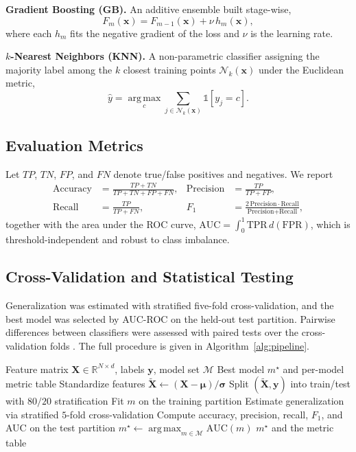 \documentclass[conference]{IEEEtran}
\begin{document}
\textbf{Gradient Boosting (GB).} An additive ensemble built stage-wise,
\begin{equation}
F_m(\mathbf{x})=F_{m-1}(\mathbf{x})+\nu\,h_m(\mathbf{x}),
\end{equation}
where each $h_m$ fits the negative gradient of the loss and $\nu$ is the learning rate.

\textbf{$k$-Nearest Neighbors (KNN).} A non-parametric classifier assigning the majority label
among the $k$ closest training points $\mathcal{N}_k(\mathbf{x})$ under the Euclidean metric,
\begin{equation}
\hat{y}=\operatorname*{arg\,max}_{c}\sum_{j\in\mathcal{N}_k(\mathbf{x})}\mathbb{1}\!\left[y_j=c\right].
\end{equation}

\subsection{Evaluation Metrics}
Let $TP$, $TN$, $FP$, and $FN$ denote true/false positives and negatives. We report
\begin{align}
\text{Accuracy}&=\frac{TP+TN}{TP+TN+FP+FN}, &
\text{Precision}&=\frac{TP}{TP+FP},\\
\text{Recall}&=\frac{TP}{TP+FN}, &
F_1&=\frac{2\,\text{Precision}\cdot\text{Recall}}{\text{Precision}+\text{Recall}},
\end{align}
together with the area under the ROC curve,
$\text{AUC}=\int_{0}^{1}\text{TPR}\,d(\text{FPR})$, which is threshold-independent and
robust to class imbalance.

\subsection{Cross-Validation and Statistical Testing}
Generalization was estimated with stratified five-fold cross-validation, and the best model was
selected by AUC-ROC on the held-out test partition. Pairwise differences between classifiers were
assessed with paired tests over the cross-validation folds \cite{kohavi1995study}. The full
procedure is given in Algorithm~\ref{alg:pipeline}.

\begin{algorithm}[!t]
\caption{Automated Classification and Evaluation Pipeline}
\label{alg:pipeline}
\begin{algorithmic}[1]
\REQUIRE Feature matrix $\mathbf{X}\in\mathbb{R}^{N\times d}$, labels $\mathbf{y}$, model set $\mathcal{M}$
\ENSURE Best model $m^{\star}$ and per-model metric table
\STATE Standardize features $\tilde{\mathbf{X}}\leftarrow(\mathbf{X}-\boldsymbol{\mu})/\boldsymbol{\sigma}$
\STATE Split $(\tilde{\mathbf{X}},\mathbf{y})$ into train/test with $80/20$ stratification
\STATE Fit $m$ on the training partition
\STATE Estimate generalization via stratified $5$-fold cross-validation
\STATE Compute accuracy, precision, recall, $F_1$, and AUC on the test partition
\ENDFOR
\STATE $m^{\star}\leftarrow\operatorname*{arg\,max}_{m\in\mathcal{M}}\text{AUC}(m)$
\RETURN $m^{\star}$ and the metric table
\end{algorithmic}
\end{algorithm}
\end{document}
